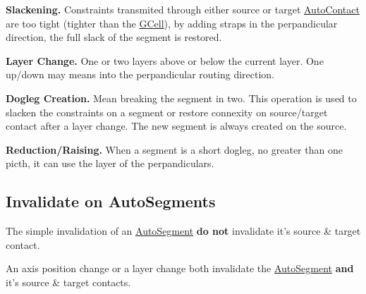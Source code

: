 \begin{DoxyItemize}
\item {\bfseries Slackening.} Constraints transmited through either source or target \hyperlink{classKatabatic_1_1AutoContact}{Auto\-Contact} are too tight (tighter than the \hyperlink{classKatabatic_1_1GCell}{G\-Cell}), by adding straps in the perpandicular direction, the full slack of the segment is restored. 
\item {\bfseries Layer Change.} One or two layers above or below the current layer. One up/down may means into the perpandicular routing direction. 
\item {\bfseries Dogleg Creation.} Mean breaking the segment in two. This operation is used to slacken the constraints on a segment or restore connexity on source/target contact after a layer change. The new segment is always created on the source. 
\item {\bfseries Reduction/\-Raising.} When a segment is a short dogleg, no greater than one picth, it can use the layer of the perpandiculars. 
\end{DoxyItemize}\hypertarget{classKatabatic_1_1AutoSegment_secASInvalidate}{}\subsection{Invalidate on Auto\-Segments}\label{classKatabatic_1_1AutoSegment_secASInvalidate}
The simple invalidation of an \hyperlink{classKatabatic_1_1AutoSegment}{Auto\-Segment} {\bfseries do not} invalidate it's source \& target contact.

An axis position change or a layer change both invalidate the \hyperlink{classKatabatic_1_1AutoSegment}{Auto\-Segment} {\bfseries and} it's source \& target contacts.

